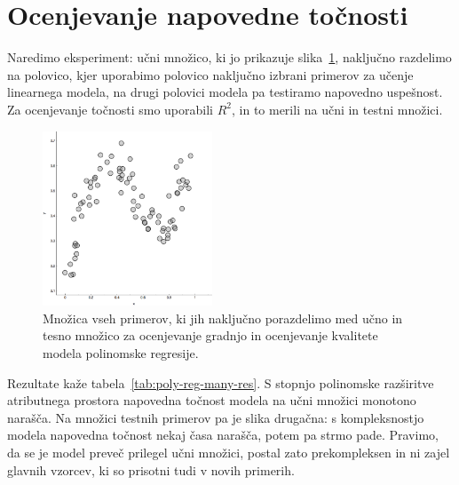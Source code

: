 \section{Ocenjevanje napovedne točnosti}

Naredimo eksperiment: učni množico, ki jo prikazuje slika~\ref{fig:poly-reg-many}, naključno razdelimo na polovico, kjer uporabimo polovico naključno izbrani primerov za učenje linearnega modela, na drugi polovici modela pa testiramo napovedno uspešnost. Za ocenjevanje točnosti smo uporabili $R^2$, in to merili na učni in testni množici.

\begin{figure}[htbp]
\begin{center}
  \includegraphics[width=0.45\textwidth]{slike/poly-reg-many.png}
\caption{Množica vseh primerov, ki jih naključno porazdelimo med učno in tesno množico za ocenjevanje gradnjo in ocenjevanje kvalitete modela polinomske regresije.}
\label{fig:poly-reg-many}
\end{center}
\end{figure}

Rezultate kaže tabela~\ref{tab:poly-reg-many-res}. S stopnjo polinomske razširitve atributnega prostora napovedna točnost modela na učni množici monotono narašča. Na množici testnih primerov pa je slika drugačna: s kompleksnostjo modela napovedna točnost nekaj časa narašča, potem pa strmo pade. Pravimo, da se je model preveč prilegel učni množici, postal zato prekompleksen in ni zajel glavnih vzorcev, ki so prisotni tudi v novih primerih.

